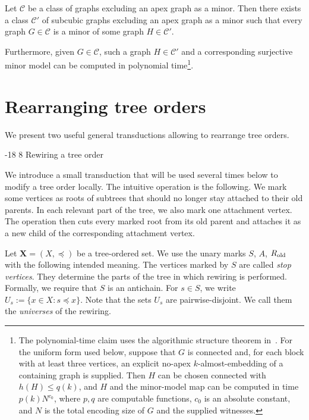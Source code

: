\documentclass[1p,number,11pt]{elsarticle}
\makeatletter
\renewcommand\subsection{\@startsection{subsection}{2}{\z@}%
  {-18\p@ \@plus -4\p@ \@minus -4\p@}%
  {8\p@ \@plus 4\p@ \@minus 4\p@}%
  {\normalfont\normalsize\bfseries}}
\theoremstyle{plain}
\newcommand{\Cc}{\mathscr{C}}
\renewcommand{\leq}{\leqslant}
\makeatother
\begin{document}
\begin{theorem}
\label{thm:milolidakis}
Let $\Cc$ be a class of graphs excluding an apex graph as a minor.
Then there exists a class $\Cc'$ of subcubic graphs excluding an apex
graph as a minor such that every graph $G\in\Cc$ is a minor of some
graph $H\in\Cc'$.

Furthermore, given $G\in\Cc$, such a graph $H\in\Cc'$ and a corresponding surjective minor model can be computed in polynomial time\footnote{The polynomial-time claim
uses the algorithmic structure theorem in~\cite{dvorak2014list}.
For the uniform form used below, suppose that $G$ is connected and,
for each block with at least three vertices, an explicit no-apex
$k$-almost-embedding of a containing graph is supplied.
Then $H$ can be chosen connected with $h(H)\leq q(k)$, and $H$ and
the minor-model map can be computed in time $p(k)N^{c_0}$,
where $p,q$ are computable functions, $c_0$ is an absolute constant,
and $N$ is the total encoding size of $G$ and the supplied witnesses.}.
\end{theorem}

\section{Rearranging tree orders}
\label{sec:technical}

We present two useful general transductions allowing to rearrange tree orders.

\subsection{Rewiring a tree order}

We introduce a small transduction that will be used several times below to modify a tree order locally.  
The intuitive operation is the following. 
We mark some vertices as roots of subtrees that should no longer stay attached to their old parents.  
In each relevant part of the tree, we also mark one attachment vertex.  
The operation then cuts every marked root from its old parent and attaches it as a new child of the corresponding attachment vertex.

Let $\mathbf X=(X,\preceq)$ be a tree-ordered set.  
We use the unary marks $S$, $A$, $R_{\rm old}$ with the following intended meaning.
The vertices marked by $S$ are called \emph{stop vertices}.  
They determine the parts of the tree in which rewiring is performed. 
Formally, we require that $S$ is an antichain. 
For $s\in S$, we write $U_s := \{x\in X : s\preceq x\}$.
Note that the sets $U_s$ are pairwise-disjoint.  
We call them the \emph{universes} of the rewiring.
\end{document}
